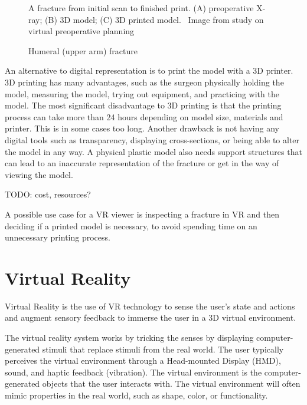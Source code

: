 \documentclass[a4paper]{report}
\begin{document}
\begin{figure}[h!]
    \centering
	\hfill
  \caption{Humeral (upper arm) fracture}
  \small
    A fracture from initial scan to finished print. (A) preoperative X-ray; (B) 3D model; (C) 3D printed model.
~Image from study on virtual preoperative planning~\cite{mishra_virtual_2019}
\end{figure}


An alternative to digital representation is to print the model with a 3D printer. 3D printing has many advantages, such as the surgeon physically holding the model, measuring the model, trying out equipment, and practicing with the model.
The most significant disadvantage to 3D printing is that the printing process can take more than 24 hours depending on model size, materials and printer. This is in some cases too long. Another drawback is not having any digital tools such as transparency, displaying cross-sections, or being able to alter the model in any way. A physical plastic model also needs support structures that can lead to an inaccurate representation of the fracture or get in the way of viewing the model.

TODO: cost, resources?

A possible use case for a VR viewer is inspecting a fracture in VR and then deciding if a printed model is necessary, to avoid spending time on an unnecessary printing process.

\section{Virtual Reality}
Virtual Reality is the use of VR technology to sense the user's state and actions and augment sensory feedback to immerse the user in a 3D virtual environment\cite{mihelj_virtual_2014}.

The virtual reality system works by tricking the senses by displaying computer-generated stimuli that replace stimuli from the real world. The user typically perceives the virtual environment through a Head-mounted Display (HMD), sound, and haptic feedback (vibration). 
The virtual environment is the computer-generated objects that the user interacts with. The virtual environment will often mimic properties in the real world, such as shape, color, or functionality.
\end{document}
